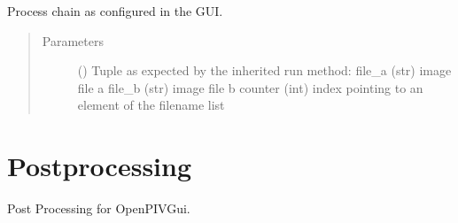 \documentclass[letterpaper,10pt,english]{sphinxmanual}
\begin{document}
\begin{fulllineitems}
\begin{fulllineitems}
\label{\detokenize{multiprocessing:openpivgui.MultiProcessing.MultiProcessing.process}}
Process chain as configured in the GUI.
\begin{quote}\begin{description}
\item[{Parameters}] \leavevmode
{} () \textendash{} Tuple as expected by the inherited run method:
file\_a (str) \textendash{} image file a
file\_b (str) \textendash{} image file b
counter (int) \textendash{} index pointing to an element of the filename list

\end{description}\end{quote}

\end{fulllineitems}


\end{fulllineitems}



\section{Postprocessing}
\label{\detokenize{postprocessing:module-openpivgui.PostProcessing}}\label{\detokenize{postprocessing:postprocessing}}\label{\detokenize{postprocessing::doc}}
Post Processing for OpenPIVGui.
\end{document}
